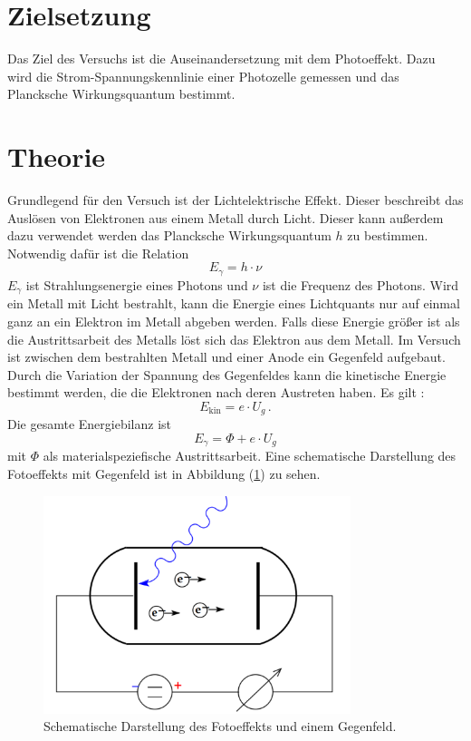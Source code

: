 \section{Zielsetzung}
\label{sec:Zielsetzung}
Das Ziel des Versuchs ist die Auseinandersetzung mit dem Photoeffekt. 
Dazu wird die Strom-Spannungskennlinie einer Photozelle gemessen und 
das Plancksche Wirkungsquantum bestimmt. 
\section{Theorie}
\label{sec:Theorie}
Grundlegend für den Versuch ist der Lichtelektrische Effekt. Dieser 
beschreibt das Auslösen von Elektronen aus einem Metall durch Licht. 
Dieser kann außerdem dazu verwendet werden das Plancksche Wirkungsquantum $h$
zu bestimmen. Notwendig dafür ist die Relation 
\begin{equation}
    E_\gamma = h \cdot \nu
\end{equation}
$E_\gamma$ ist Strahlungsenergie eines Photons und $\nu$ ist die Frequenz 
des Photons. Wird ein Metall mit Licht bestrahlt, kann die Energie 
eines Lichtquants nur auf einmal ganz an ein Elektron im Metall 
abgeben werden. Falls diese Energie größer ist als die Austrittsarbeit 
des Metalls löst sich das Elektron aus dem Metall. Im Versuch ist 
zwischen dem bestrahlten Metall und einer Anode ein Gegenfeld aufgebaut. 
Durch die Variation der Spannung des Gegenfeldes kann die kinetische Energie 
bestimmt werden, die die Elektronen nach deren Austreten haben. 
Es gilt : 
\begin{equation}
    E_{\text{kin}} = e \cdot U_g \,.
\end{equation}
Die gesamte Energiebilanz ist 
\begin{equation}
    E_{\gamma} = \Phi + e \cdot U_g 
\end{equation}
mit $\Phi$ als materialspeziefische Austrittsarbeit. 
Eine schematische Darstellung des Fotoeffekts mit Gegenfeld ist in 
Abbildung (\ref{fig:Schematische_Idee}) zu sehen. 
\begin{figure}[H]
  \centering
  \includegraphics[width=0.8\textwidth]{content/Bilder/Schematischer_Aufbau.png}
  \caption{Schematische Darstellung des Fotoeffekts und einem Gegenfeld.}
  \label{fig:Schematische_Idee}
\end{figure}

